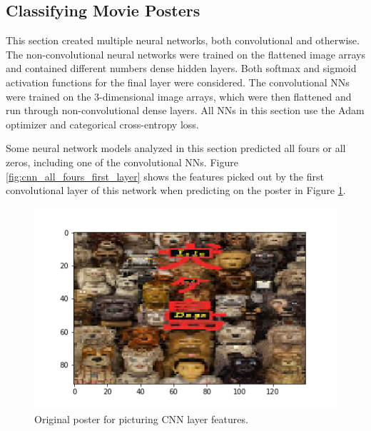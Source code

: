 \documentclass[12pt, oneside]{article}   	%
\begin{document}
\subsection{Classifying Movie Posters}

This section created multiple neural networks, both convolutional and otherwise. The non-convolutional neural networks were trained on the flattened image arrays and contained different numbers dense hidden layers. Both softmax and sigmoid activation functions for the final layer were considered. The convolutional NNs were trained on the 3-dimensional image arrays, which were then flattened and run through non-convolutional dense layers. All NNs in this section use the Adam optimizer and categorical cross-entropy loss.

Some neural network models analyzed in this section predicted all fours or all zeros, including one of the convolutional NNs. Figure \ref{fig:cnn_all_fours_first_layer} shows the features picked out by the first convolutional layer of this network when predicting on the poster in Figure \ref{fig:isle_of_dogs_poster}.

\begin{figure}%
\includegraphics[width=\textwidth]{isle_of_dogs_poster}
\caption{\label{fig:isle_of_dogs_poster}Original poster for picturing CNN layer features.}
\end{figure}
\end{document}
